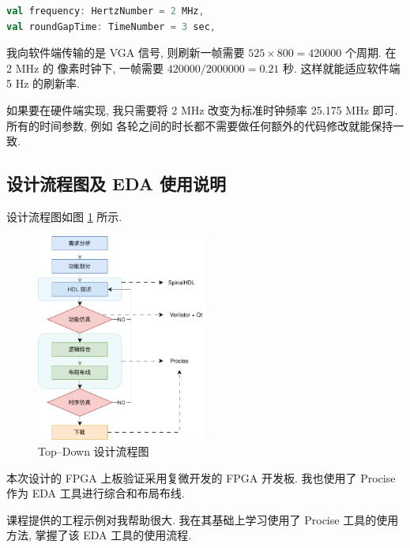 \begin{lstlisting}[caption={SpinalHDL 中的时间参数}, label={code:spinaltime}, language=scala]
val frequency: HertzNumber = 2 MHz,
val roundGapTime: TimeNumber = 3 sec,
\end{lstlisting}

我向软件端传输的是 VGA 信号, 则刷新一帧需要 $525 \times 800 = 420000$ 个周期. 在 2 MHz 的
像素时钟下, 一帧需要 $420000 / 2000000 = 0.21$ 秒. 这样就能适应软件端 5 Hz 的刷新率.

如果要在硬件端实现, 我只需要将 2 MHz 改变为标准时钟频率 25.175 MHz 即可. 所有的时间参数, 例如
各轮之间的时长都不需要做任何额外的代码修改就能保持一致. 

\subsection{设计流程图及 EDA 使用说明}

设计流程图如图 \ref{fig:flowpath} 所示.

\begin{figure}
    \centering
    \includegraphics[width=0.5\textwidth]{res/img/flowpath.pdf}
    \caption{Top--Down 设计流程图}
    \label{fig:flowpath}
\end{figure}

本次设计的 FPGA 上板验证采用复微开发的 FPGA 开发板. 我也使用了 Procise 作为 EDA 工具进行综合和布局布线.

课程提供的工程示例对我帮助很大. 我在其基础上学习使用了 Procise 工具的使用方法, 掌握了该 EDA 工具的使用流程. 
